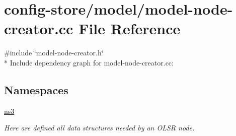 \hypertarget{model-node-creator_8cc}{}\section{config-\/store/model/model-\/node-\/creator.cc File Reference}
\label{model-node-creator_8cc}
{\ttfamily \#include \char`\"{}model-\/node-\/creator.\+h\char`\"{}}\\*
Include dependency graph for model-\/node-\/creator.cc\+:
\subsection*{Namespaces}
\begin{DoxyCompactItemize}
\item 
 \hyperlink{namespacens3}{ns3}
\begin{DoxyCompactList}\small\item\em Here are defined all data structures needed by an O\+L\+SR node. \end{DoxyCompactList}\end{DoxyCompactItemize}
